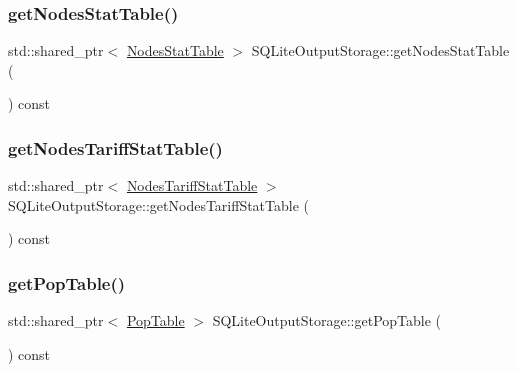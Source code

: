 \mbox{\label{class_s_q_lite_output_storage_ab29b6e0c9169e04f67f19f5b09ae3dff}} 
\subsubsection{\texorpdfstring{getNodesStatTable()}{getNodesStatTable()}}
{\footnotesize\ttfamily std\+::shared\+\_\+ptr$<$ \mbox{\hyperlink{class_nodes_stat_table}{Nodes\+Stat\+Table}} $>$ S\+Q\+Lite\+Output\+Storage\+::get\+Nodes\+Stat\+Table (\begin{DoxyParamCaption}{ }\end{DoxyParamCaption}) const}

\mbox{\label{class_s_q_lite_output_storage_a820656892a8258bbda69f70d56701347}} 
\subsubsection{\texorpdfstring{getNodesTariffStatTable()}{getNodesTariffStatTable()}}
{\footnotesize\ttfamily std\+::shared\+\_\+ptr$<$ \mbox{\hyperlink{class_nodes_tariff_stat_table}{Nodes\+Tariff\+Stat\+Table}} $>$ S\+Q\+Lite\+Output\+Storage\+::get\+Nodes\+Tariff\+Stat\+Table (\begin{DoxyParamCaption}{ }\end{DoxyParamCaption}) const}

\mbox{\label{class_s_q_lite_output_storage_a0764d947298bdd4c9a9eb2451573ce39}} 
\subsubsection{\texorpdfstring{getPopTable()}{getPopTable()}}
{\footnotesize\ttfamily std\+::shared\+\_\+ptr$<$ \mbox{\hyperlink{class_pop_table}{Pop\+Table}} $>$ S\+Q\+Lite\+Output\+Storage\+::get\+Pop\+Table (\begin{DoxyParamCaption}{ }\end{DoxyParamCaption}) const}

